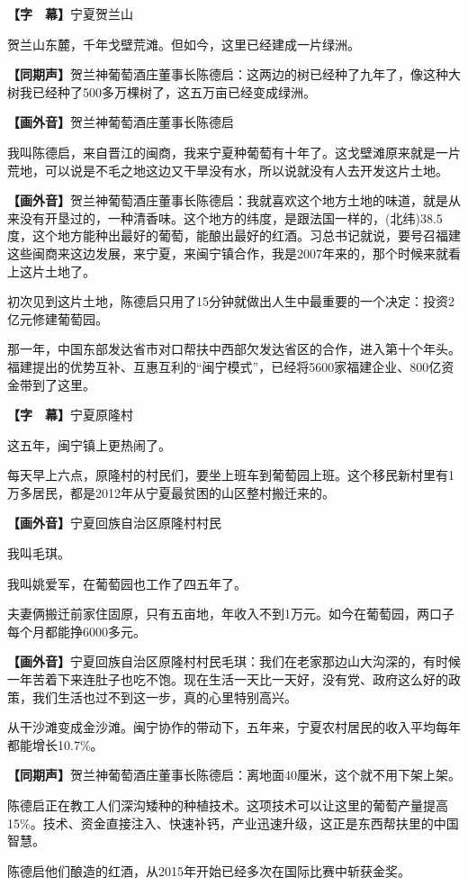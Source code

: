 \documentclass{ctexart}
\newcommand{\zkh}[1]{\textbf{\hspace{-2.7em} 【#1】}}
\begin{document}
\zkh{字　幕}宁夏贺兰山

贺兰山东麓，千年戈壁荒滩。但如今，这里已经建成一片绿洲。

\zkh{同期声}贺兰神葡萄酒庄董事长陈德启：这两边的树已经种了九年了，像这种大树我已经种了500多万棵树了，这五万亩已经变成绿洲。

\zkh{画外音}贺兰神葡萄酒庄董事长陈德启

我叫陈德启，来自晋江的闽商，我来宁夏种葡萄有十年了。这戈壁滩原来就是一片荒地，可以说是不毛之地这边又干旱没有水，所以说就没有人去开发这片土地。

\zkh{画外音}贺兰神葡萄酒庄董事长陈德启：我就喜欢这个地方土地的味道，就是从来没有开垦过的，一种清香味。这个地方的纬度，是跟法国一样的，(北纬)38.5度，这个地方能种出最好的葡萄，能酿出最好的红酒。习总书记就说，要号召福建这些闽商来这边发展，来宁夏，来闽宁镇合作，我是2007年来的，那个时候来就看上这片土地了。

初次见到这片土地，陈德启只用了15分钟就做出人生中最重要的一个决定：投资2亿元修建葡萄园。

那一年，中国东部发达省市对口帮扶中西部欠发达省区的合作，进入第十个年头。福建提出的优势互补、互惠互利的``闽宁模式''，已经将5600家福建企业、800亿资金带到了这里。

\zkh{字　幕}宁夏原隆村

这五年，闽宁镇上更热闹了。

每天早上六点，原隆村的村民们，要坐上班车到葡萄园上班。这个移民新村里有1万多居民，都是2012年从宁夏最贫困的山区整村搬迁来的。

\zkh{画外音}宁夏回族自治区原隆村村民

我叫毛琪。

我叫姚爱军，在葡萄园也工作了四五年了。

夫妻俩搬迁前家住固原，只有五亩地，年收入不到1万元。如今在葡萄园，两口子每个月都能挣6000多元。

\zkh{画外音}宁夏回族自治区原隆村村民毛琪：我们在老家那边山大沟深的，有时候一年苦着下来连肚子也吃不饱。现在生活一天比一天好，没有党、政府这么好的政策，我们生活也过不到这一步，真的心里特别高兴。

从干沙滩变成金沙滩。闽宁协作的带动下，五年来，宁夏农村居民的收入平均每年都能增长10.7{\%}。

\zkh{同期声}贺兰神葡萄酒庄董事长陈德启：离地面40厘米，这个就不用下架上架。

陈德启正在教工人们深沟矮种的种植技术。这项技术可以让这里的葡萄产量提高15{\%}。技术、资金直接注入、快速补钙，产业迅速升级，这正是东西帮扶里的中国智慧。

陈德启他们酿造的红酒，从2015年开始已经多次在国际比赛中斩获金奖。
\end{document}

